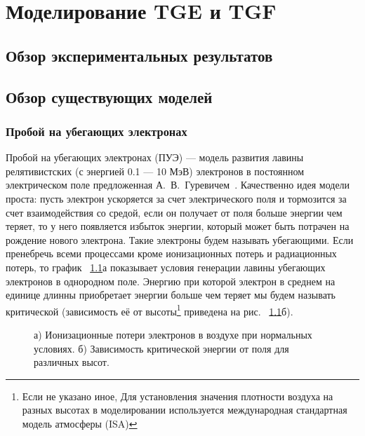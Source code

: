\chapter{Моделирование TGE и TGF
}\label{ch:thunderstorm}

\section{Обзор экспериментальных результатов
}\label{sec:thunderstorm/review-exp}

\section{Обзор существующих моделей}\label{sec:thunderstorm/review-mod}

\subsection{Пробой на убегающих электронах}
%
Пробой на убегающих электронах (ПУЭ) --- модель развития лавины релятивистских (с энергией 0.1 --- 10 МэВ) электронов в постоянном электрическом поле предложенная А.~В.~Гуревичем~\cite{gurevich1992runaway,Gurevich2001ufn}. Качественно идея модели проста: пусть электрон ускоряется за счет электрического поля и тормозится за счет взаимодействия со средой, если он получает от поля больше энергии чем теряет, то у него появляется избыток энергии, который может быть потрачен на рождение нового электрона. Такие электроны будем называть убегающими. Если пренебречь всеми процессами кроме ионизационных потерь и радиационных потерь, то график ~\ref{fig:storm:gurevich}а показывает условия генерации лавины убегающих электронов в однородном поле. Энергию при которой электрон в среднем на единице длинны приобретает энергии больше чем теряет мы будем называть критической (зависимость её от высоты\footnote{Если не указано иное, Для установления значения плотности воздуха на разных высотах в моделировании используется международная стандартная модель атмосферы (ISA)} приведена на рис. ~\ref{fig:storm:gurevich}б).

\begin{figure}[t]
    \begin{center}
        \begin{minipage}[h]{0.49\linewidth}
        \end{minipage}
        \hfill
        \begin{minipage}[h]{0.49\linewidth}
        \end{minipage}
        \caption{а) Ионизационные потери электронов в воздухе при нормальных условиях. б) Зависимость критической энергии от поля для различных высот.}
    \end{center}
    \label{fig:storm:gurevich}
\end{figure}

